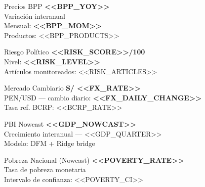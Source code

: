 \documentclass[10pt,a4paper]{article}
\newcommand{\kpivalue}[1]{%
  {\fontsize{18}{20}\selectfont\bfseries\color{ink}#1}%
}
\newcommand{\kpilabel}[1]{%
  {\small\color{ink3}#1}%
}
\newcommand{\kpidelta}[1]{%
  {\small\bfseries\color{teal}#1}%
}
\begin{document}
\noindent
\begin{minipage}[t]{0.32\textwidth}
  \begin{kpibox}{Precios BPP}
    \kpivalue{<<BPP_YOY>>}\\[2pt]
    \kpilabel{Variación interanual}\\[4pt]
    \kpilabel{Mensual:} \kpidelta{<<BPP_MOM>>}\\
    \kpilabel{Productos:} {\small\color{ink}<<BPP_PRODUCTS>>}
  \end{kpibox}
\end{minipage}%
\hfill
\begin{minipage}[t]{0.32\textwidth}
  \begin{kpibox}{Riesgo Político}
    \kpivalue{<<RISK_SCORE>>/100}\\[2pt]
    \kpilabel{Nivel:} {\small\bfseries\color{ink}<<RISK_LEVEL>>}\\[4pt]
    \kpilabel{Artículos monitoreados:} {\small\color{ink}<<RISK_ARTICLES>>}
  \end{kpibox}
\end{minipage}%
\hfill
\begin{minipage}[t]{0.32\textwidth}
  \begin{kpibox}{Mercado Cambiario}
    \kpivalue{S/ <<FX_RATE>>}\\[2pt]
    \kpilabel{PEN/USD — cambio diario:} \kpidelta{<<FX_DAILY_CHANGE>>}\\[4pt]
    \kpilabel{Tasa ref. BCRP:} {\small\color{ink}<<BCRP_RATE>>}
  \end{kpibox}
\end{minipage}

\vspace{0.6em}

\noindent
\begin{minipage}[t]{0.49\textwidth}
  \begin{kpibox}{PBI Nowcast}
    \kpivalue{<<GDP_NOWCAST>>}\\[2pt]
    \kpilabel{Crecimiento interanual — <<GDP_QUARTER>>}\\[4pt]
    \kpilabel{Modelo: DFM + Ridge bridge}
  \end{kpibox}
\end{minipage}%
\hfill
\begin{minipage}[t]{0.49\textwidth}
  \begin{kpibox}{Pobreza Nacional (Nowcast)}
    \kpivalue{<<POVERTY_RATE>>}\\[2pt]
    \kpilabel{Tasa de pobreza monetaria}\\[4pt]
    \kpilabel{Intervalo de confianza: <<POVERTY_CI>>}
  \end{kpibox}
\end{minipage}
\end{document}
